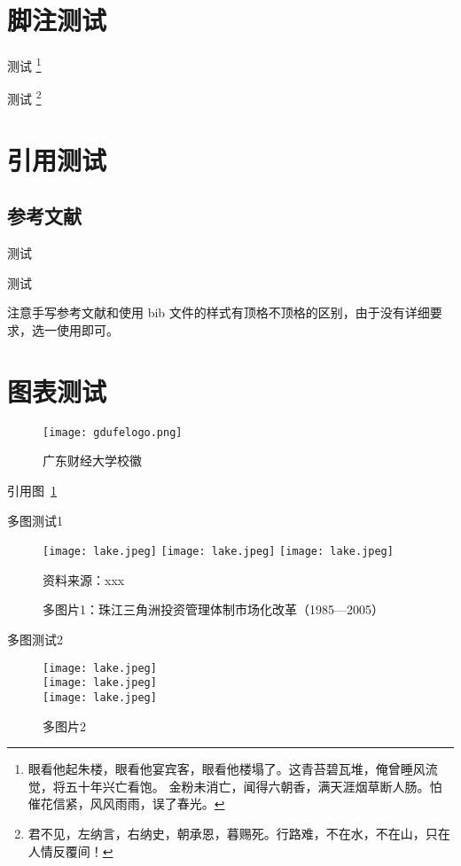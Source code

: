 \section{脚注测试}

测试 \footnote{眼看他起朱楼，眼看他宴宾客，眼看他楼塌了。这青苔碧瓦堆，俺曾睡风流觉，将五十年兴亡看饱。
    金粉未消亡，闻得六朝香，满天涯烟草断人肠。怕催花信紧，风风雨雨，误了春光。}

测试 \footnote[3]{君不见，左纳言，右纳史，朝承恩，暮赐死。行路难，不在水，不在山，只在人情反覆间！}

\section{引用测试}

\subsection{参考文献}

测试 \cite{huangzh,anon-cn1,anon-cn2,anon-cn3,anon-cn4,anon-cn5}

测试 \cite*{anon-en1,anon-en2,anon-en3,anon-en4,anon-en5}

注意手写参考文献和使用 bib 文件的样式有顶格不顶格的区别，由于没有详细要求，选一使用即可。

\section{图表测试}

\begin{figure}[ht]
    \centering
    \texttt{[image: gdufelogo.png]}
    \caption{广东财经大学校徽}
    \label{fig:广东财经大学校徽}
\end{figure}

引用图~\ref{fig:广东财经大学校徽}

多图测试1
\begin{figure}[H]
    \centering
    \texttt{[image: lake.jpeg]}\hfill
    \texttt{[image: lake.jpeg]}\hfill
    \texttt{[image: lake.jpeg]}
    \caption{多图片1：珠江三角洲投资管理体制市场化改革（1985---2005）\the\baselineskip}
    { 资料来源：xxx\the\baselineskip}
    \label{fig:MultiPic1}
\end{figure}

多图测试2
\begin{figure}[h]
    \centering
    \texttt{[image: lake.jpeg]}\\
    \texttt{[image: lake.jpeg]}\\
    \texttt{[image: lake.jpeg]}
    \caption{多图片2}
    \label{fig:MultiPic2}
\end{figure}

